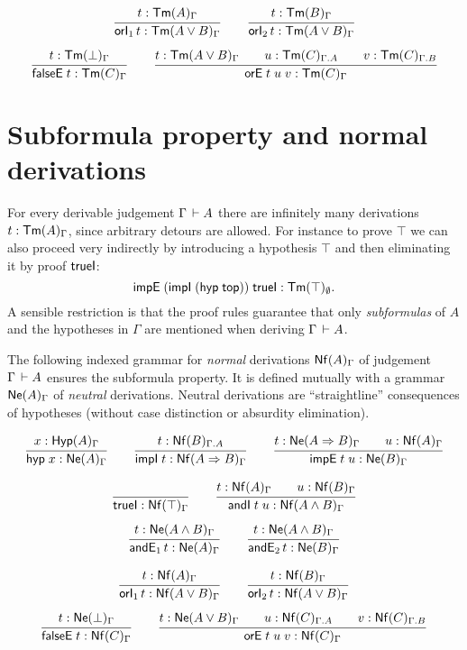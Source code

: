 \documentclass[a4paper]{article}
\begin{document}
\begin{gather*}
  \ru{t : \TmG A
    }{\orI1 t : \TmG {A \lor B}
    }
\qquad
  \ru{t : \TmG B
    }{\orI2 t : \TmG {A \lor B}
    }
\\[1ex]
  \ru{t : \TmG \bot
    }{\falseE t : \TmG C}
\qquad
  \ru{t : \TmG {A \lor B} \qquad
      u : \Tm[\Gamma.A]C  \qquad
      v : \Tm[\Gamma.B]C
    }{\orE t u v : \TmG C}
\end{gather*}

\section{Subformula property and normal derivations}

For every derivable judgement $\Gamma \der A$ there are infinitely
many derivations $t : \TmG A$, since arbitrary detours are allowed.
For instance to prove $\top$ we can also proceed very indirectly by
introducing a hypothesis $\top$ and then eliminating it by proof
$\trueI$:
\[\impEP{\impIP{\hyp{\ttop}}}{\trueI} : \Tm[\cempty]\top.\]
A sensible restriction is that the proof rules guarantee that only
\emph{subformulas} of $A$ and the hypotheses in $\Gamma$ are mentioned when
deriving $\Gamma \der A$.

The following indexed grammar for \emph{normal} derivations $\NfG A$ of
judgement $\Gamma \der A$ ensures the subformula property.  It is
defined mutually with a grammar $\NeG A$ of \emph{neutral} derivations.
Neutral derivations are ``straightline'' consequences of hypotheses
(without case distinction or absurdity elimination).

\begin{gather*}
  \ru{x : \Hyp[\Gamma]A}{\hyp x : \NeG A}
\qquad
  \ru{t : \Nf[\Gamma.A]B}{\impI t : \NfG{A \imp B}}
\qquad
  \ru{t : \NeG{A \imp B} \qquad
      u : \NfG A
    }{\impE t u : \NeG B}
\end{gather*}

\begin{gather*}
  \ru{}{\trueI : \NfG\top}
\qquad
  \ru{t : \NfG A \qquad
      u : \NfG B
    }{\andI t u : \NfG{A \land B}
    }
\\[1ex]
  \ru{t : \NeG{A \land B}
    }{\andE1 t : \NeG A
    }
\qquad
  \ru{t : \NeG{A \land B}
    }{\andE2 t : \NeG B
    }
\end{gather*}

\begin{gather*}
  \ru{t : \NfG A
    }{\orI1 t : \NfG {A \lor B}
    }
\qquad
  \ru{t : \NfG B
    }{\orI2 t : \NfG {A \lor B}
    }
\\[1ex]
  \ru{t : \NeG \bot
    }{\falseE t : \NfG C}
\qquad
  \ru{t : \NeG {A \lor B} \qquad
      u : \Nf[\Gamma.A]C  \qquad
      v : \Nf[\Gamma.B]C
    }{\orE t u v : \NfG C}
\end{gather*}
\end{document}
